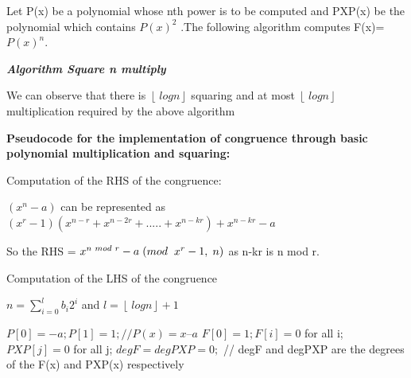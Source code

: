 \documentclass[a4paper,12pt]{article}
\begin{document}
\begin{flushleft}
	Let P(x) be a polynomial whose nth power is to be computed and PXP(x) be the
polynomial which contains \(P(x)^2\)  .The following algorithm computes F(x)=\(P(x)^n\).
\end{flushleft}

\vspace{0.1in}
\begin{flushleft}
	\textbf{\textit{Algorithm Square n multiply}}
\end{flushleft}

We can observe that there is \(\left\lfloor\ logn \right\rfloor\) squaring and at most \(\left\lfloor\ logn \right\rfloor\) multiplication required by the above algorithm

\begin{flushleft}
	\textbf{Pseudocode for the implementation of congruence through basic polynomial
multiplication and squaring:}
\end{flushleft}

\begin{flushleft}
	Computation of the RHS of the congruence:
\end{flushleft}
\((x^n-a)\) can be represented as \((x^r - 1)(x^{n-r} + x^{n-2r} +.....+ x^{n-kr}) + x^{n-kr} - a\)

\begin{flushleft}
	So the RHS = \(x^{n \hspace{0.1cm} mod \hspace{0.1cm} r} - a \hspace{0.1cm} (mod \hspace{0.2cm} x^r -1,\hspace{0.1cm} n)\) as n-kr is n mod r.
\end{flushleft}

\begin{flushleft}
	Computation of the LHS of the congruence
\end{flushleft}

 \begin{flushleft}
 	\(n=\sum_{i=0}^{l}b_{i}2^i\) and \(l = \left\lfloor\ logn \right\rfloor +1 \)
 \end{flushleft}
 
\begin{flushleft}
	\(P[0]=-a ; P[1]=1 ; // P(x) = x – a \)
	\vspace{0.1in}
\newline
\(F[0] = 1 ; F[i] = 0 \) for all i;
\vspace{0.1in}
\newline
\(PXP [j] = 0 \) for all j;
\vspace{0.1in}
\newline
\(degF = degPXP = 0;\)
\vspace{0.05in}
\newline
 // degF and degPXP are the degrees of the F(x) and PXP(x) respectively
\end{flushleft}
\end{document}
